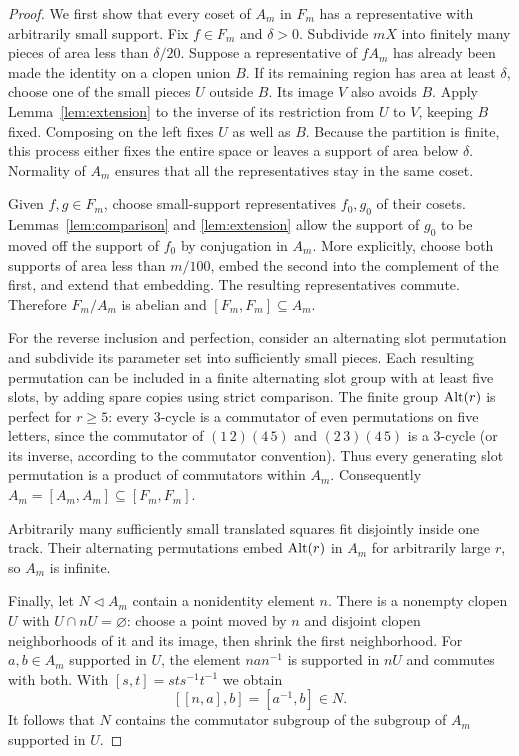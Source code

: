 \begin{proof}
We first show that every coset of $A_m$ in $F_m$ has a representative
with arbitrarily small support. Fix $f\in F_m$ and $\delta>0$.
Subdivide $mX$ into finitely many pieces of area less than
$\delta/20$. Suppose a representative of $fA_m$ has already been
made the identity on a clopen union $B$. If its remaining region has
area at least $\delta$, choose one of the small pieces $U$ outside
$B$. Its image $V$ also avoids $B$. Apply
Lemma~\ref{lem:extension} to the inverse of its restriction from
$U$ to $V$, keeping $B$ fixed. Composing on the left fixes $U$ as
well as $B$. Because the partition is finite, this process either
fixes the entire space or leaves a support of area below $\delta$.
Normality of $A_m$ ensures that all the representatives stay in the
same coset.

Given $f,g\in F_m$, choose small-support representatives $f_0,g_0$
of their cosets. Lemmas~\ref{lem:comparison} and
\ref{lem:extension} allow the support of $g_0$ to be moved off the
support of $f_0$ by conjugation in $A_m$. More explicitly, choose
both supports of area less than $m/100$, embed the second into the
complement of the first, and extend that embedding. The resulting
representatives commute. Therefore $F_m/A_m$ is abelian and
$[F_m,F_m]\subseteq A_m$.

For the reverse inclusion and perfection, consider an alternating
slot permutation and subdivide its parameter set into sufficiently
small pieces. Each resulting permutation can be included in a finite
alternating slot group with at least five slots, by adding spare
copies using strict comparison. The finite group $\operatorname{Alt}(r)$ is
perfect for $r\ge5$: every $3$-cycle is a commutator of even
permutations on five letters, since the commutator of
$(1\,2)(4\,5)$ and $(2\,3)(4\,5)$ is a $3$-cycle (or its inverse,
according to the commutator convention). Thus every generating
slot permutation is a product of commutators within $A_m$.
Consequently $A_m=[A_m,A_m]\subseteq[F_m,F_m]$.

Arbitrarily many sufficiently small translated squares fit disjointly
inside one track. Their alternating permutations embed $\operatorname{Alt}(r)$
in $A_m$ for arbitrarily large $r$, so $A_m$ is infinite.

Finally, let $N\lhd A_m$ contain a nonidentity element $n$.
There is a nonempty clopen $U$ with $U\cap nU=\varnothing$:
choose a point moved by $n$ and disjoint clopen neighborhoods of it
and its image, then shrink the first neighborhood. For $a,b\in A_m$
supported in $U$, the element $nan^{-1}$ is supported in $nU$ and
commutes with both. With $[s,t]=sts^{-1}t^{-1}$ we obtain
\[
 [[n,a],b]=[a^{-1},b]\in N.
\]
It follows that $N$ contains the commutator subgroup of the subgroup
of $A_m$ supported in $U$.


\end{proof}
